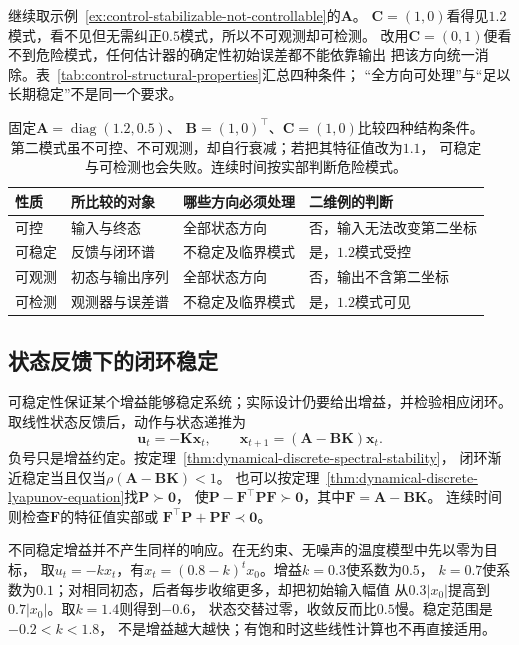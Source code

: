 继续取示例~\ref{ex:control-stabilizable-not-controllable}的$\bm A$。
$\bm C=(1,0)$看得见$1.2$模式，看不见但无需纠正$0.5$模式，所以不可观测却可检测。
改用$\bm C=(0,1)$便看不到危险模式，任何估计器的确定性初始误差都不能依靠输出
把该方向统一消除。表~\ref{tab:control-structural-properties}汇总四种条件；
“全方向可处理”与“足以长期稳定”不是同一个要求。
\begin{table}[htbp]
  \centering
  \begin{tabularx}{\linewidth}{lXXX}
    \toprule
    性质 & 所比较的对象 & 哪些方向必须处理 & 二维例的判断\\
    \midrule
    可控 & 输入与终态 & 全部状态方向 & 否，输入无法改变第二坐标\\
    可稳定 & 反馈与闭环谱 & 不稳定及临界模式 & 是，$1.2$模式受控\\
    可观测 & 初态与输出序列 & 全部状态方向 & 否，输出不含第二坐标\\
    可检测 & 观测器与误差谱 & 不稳定及临界模式 & 是，$1.2$模式可见\\
    \bottomrule
  \end{tabularx}
  \caption{固定$\bm A=\operatorname{diag}(1.2,0.5)$、
  $\bm B=(1,0)^\top$、$\bm C=(1,0)$比较四种结构条件。
  第二模式虽不可控、不可观测，却自行衰减；若把其特征值改为$1.1$，
  可稳定与可检测也会失败。连续时间按实部判断危险模式。}
  \label{tab:control-structural-properties}
  \label{tab:control-structural-comparison}
\end{table}

\subsection{状态反馈下的闭环稳定}
\label{sec:control-state-feedback-stability}
可稳定性保证某个增益能够稳定系统；实际设计仍要给出增益，并检验相应闭环。
取线性状态反馈后，动作与状态递推为
\begin{equation}
  \bm u_t=-\bm K\bm x_t,
  \qquad \bm x_{t+1}=(\bm A-\bm B\bm K)\bm x_t.
  \label{eq:control-state-feedback}
\end{equation}
负号只是增益约定。按定理~\ref{thm:dynamical-discrete-spectral-stability}，
闭环渐近稳定当且仅当$\rho(\bm A-\bm B\bm K)<1$。
也可以按定理~\ref{thm:dynamical-discrete-lyapunov-equation}找$\bm P\succ\bm0$，
使$\bm P-\bm F^\top\bm P\bm F\succ\bm0$，其中$\bm F=\bm A-\bm B\bm K$。
连续时间则检查$\bm F$的特征值实部或
$\bm F^\top\bm P+\bm P\bm F\prec\bm0$。

不同稳定增益并不产生同样的响应。在无约束、无噪声的温度模型中先以零为目标，
取$u_t=-kx_t$，有$x_t=(0.8-k)^t x_0$。增益$k=0.3$使系数为$0.5$，
$k=0.7$使系数为$0.1$；对相同初态，后者每步收缩更多，却把初始输入幅值
从$0.3|x_0|$提高到$0.7|x_0|$。取$k=1.4$则得到$-0.6$，
状态交替过零，收敛反而比$0.5$慢。稳定范围是$-0.2<k<1.8$，
不是增益越大越快；有饱和时这些线性计算也不再直接适用。


